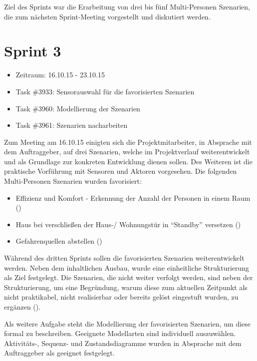 \documentclass[12pt, oneside, smallheadings]{scrbook}
\begin{document}
Ziel des Sprints war die Erarbeitung von drei bis fünf Multi-Personen Szenarien, die zum nächsten Sprint-Meeting vorgestellt und diskutiert werden.

\section{Sprint 3}
\begin{itemize}
	\item Zeitraum: 16.10.15 - 23.10.15 \newline
	\item Task \#3933: Sensorauswahl für die favorisierten Szenarien
	\item Task \#3960: Modellierung der Szenarien
	\item Task \#3961: Szenarien nacharbeiten\\
\end{itemize}
\noindent
Zum Meeting am 16.10.15 einigten sich die Projektmitarbeiter, in Absprache mit dem Auftraggeber, auf drei Szenarien, welche im Projektverlauf weiterentwickelt und als Grundlage zur konkreten Entwicklung dienen sollen. Des Weiteren ist die praktische Vorführung mit Sensoren und Aktoren vorgesehen.
Die folgenden Multi-Personen Szenarien wurden favorisiert:
\begin{itemize}
	\item Effizienz und Komfort - Erkennung der Anzahl der Personen in einem Raum ()
	\item Haus bei verschließen der Haus-/ Wohnungstür in "`Standby"' versetzen ()
	\item Gefahrenquellen abstellen ()\\
\end{itemize}
\noindent
Während des dritten Sprints sollen die favorisierten Szenarien weiterentwickelt werden. Neben dem inhaltlichen Ausbau, wurde eine einheitliche Strukturierung als Ziel festgelegt. Die Szenarien, die nicht weiter verfolgt werden, sind neben der Strukturierung, um eine Begründung, warum diese zum aktuellen Zeitpunkt als nicht praktikabel, nicht realisierbar oder bereits gelöst eingestuft wurden, zu ergänzen ().

Als weitere Aufgabe steht die Modellierung der favorisierten Szenarien, um diese formal zu beschreiben. Geeignete Modellarten sind individuell auszuwählen. Aktivitäts-, Sequenz- und Zustandsdiagramme wurden in Absprache mit dem Auftraggeber als geeignet festgelegt.
\end{document}
